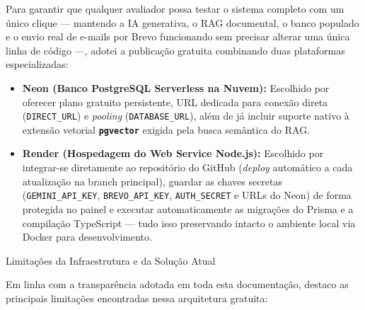 \documentclass[11pt,a4paper]{article}
\newcommand{\subtituloSecao}[1]{%
  \par\addvspace{10pt}%
  {\noindent\fontsize{16pt}{20pt}\selectfont\normalfont\color{headingBlue}#1\par}%
  \vspace{3pt}%
}
\begin{document}
Para garantir que qualquer avaliador possa testar o sistema completo com um único clique — mantendo a IA generativa, o RAG documental, o banco populado e o envio real de e-mails por Brevo funcionando sem precisar alterar uma única linha de código —, adotei a publicação gratuita combinando duas plataformas especializadas:

\begin{itemize}[leftmargin=1.25cm, label=\textbullet, topsep=2pt, itemsep=5pt]
  \item \textbf{Neon (Banco PostgreSQL Serverless na Nuvem):} Escolhido por oferecer plano gratuito persistente, URL dedicada para conexão direta (\texttt{DIRECT\_URL}) e \textit{pooling} (\texttt{DATABASE\_URL}), além de já incluir suporte nativo à extensão vetorial \textbf{\texttt{pgvector}} exigida pela busca semântica do RAG.
  \item \textbf{Render (Hospedagem do Web Service Node.js):} Escolhido por integrar-se diretamente ao repositório do GitHub (\textit{deploy} automático a cada atualização na branch principal), guardar as chaves secretas (\texttt{GEMINI\_API\_KEY}, \texttt{BREVO\_API\_KEY}, \texttt{AUTH\_SECRET} e URLs do Neon) de forma protegida no painel e executar automaticamente as migrações do Prisma e a compilação TypeScript — tudo isso preservando intacto o ambiente local via Docker para desenvolvimento.
\end{itemize}

\subtituloSecao{Limitações da Infraestrutura e da Solução Atual}

Em linha com a transparência adotada em toda esta documentação, destaco as principais limitações encontradas nessa arquitetura gratuita:
\end{document}
